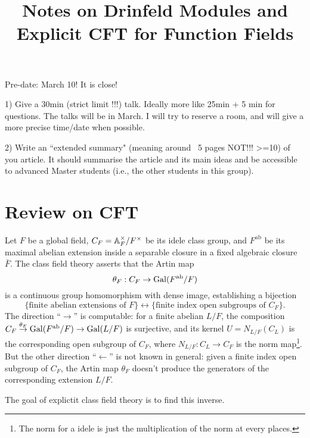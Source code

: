 \documentclass{article}
\title{Notes on Drinfeld Modules and Explicit CFT for Function Fields}
\newcommand{\ab}{\mathrm{ab}}
\begin{document}
\maketitle

Pre-date: March 10! It is close!

1) Give a 30min (strict limit !!!) talk. Ideally more like 25min + 5 min for questions.  The talks will be in March. I will try to reserve a room, and will give a more precise time/date when possible.

2) Write an ``extended summary" (meaning around ~5 pages NOT!!! >=10) of you article. It should summarise the article and its main ideas and be accessible to advanced Master students (i.e., the other students in this group).

\section{Review on CFT}
Let $F$ be a global field, $C_F = \mathbb{A}_F^\times/F^\times$ be its idele class group, and $F^\ab$ be its maximal abelian extension inside a separable closure in a fixed algebraic closure $\bar F$.
The class field theory asserts that the Artin map
\[\theta_F : C_F\to\gal(F^\ab/F)\]
is a continuous group homomorphism with dense image,
establishing a bijection
\[\{\text{finite abelian extensions of }F\}\longleftrightarrow \{\text{finite index open subgroups of }C_F\}.\]
The direction ``$\to$'' is computable: for a finite abelian $L/F$,
the composition $C_F\stackrel{\theta_F}{\to}\gal(F^\ab/F)\to\gal(L/F)$ is surjective,
and its kernel $U = N_{L/F}(C_L)$ is the corresponding open subgroup of $C_F$, where $N_{L/F} : C_L\to C_F$ is the norm map\footnote{
    The norm for a idele is just the multiplication of the norm at every places.}.
But the other direction ``$\gets$'' is not known in general:
given a finite index open subgroup of $C_F$,
the Artin map $\theta_F$ doesn't produce the generators of the corresponding extension $L/F$.

The goal of explictit class field theory is to find this inverse.
\end{document}
